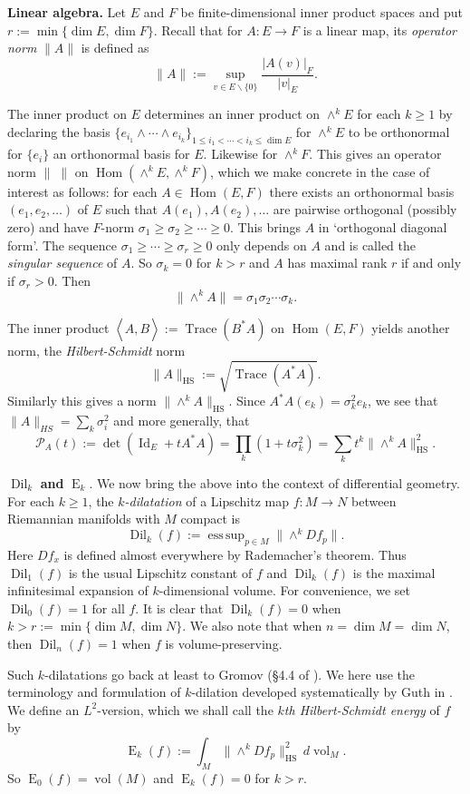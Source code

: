 \documentclass[11pt,letterpaper]{amsart}
\theoremstyle{definition}
\numberwithin{equation}{section}
\theoremstyle{definition}
\newcommand{\Pc}{\mathcal{P}}
\newcommand\ssm{\smallsetminus}
\DeclareMathOperator{\En}{E}
\DeclareMathOperator{\HS}{HS}
\DeclareMathOperator{\Id}{Id}
\DeclareMathOperator{\Hom}{Hom}
\DeclareMathOperator{\tr}{Trace}
\DeclareMathOperator{\la}{\langle}
\DeclareMathOperator{\ra}{\rangle}
\DeclareMathOperator*{\esssup}{ess\,sup}
\newcommand{\Dil}{\operatorname{Dil}}
\newcommand{\vol}{\operatorname{vol}}
\begin{document}
\medskip
\noindent
{\bf Linear algebra.} Let $E$ and $F$ be finite-dimensional inner product spaces and put $r:=\min\{\dim E,\dim F\}$.  Recall that for $A: E\to F$ is a linear map, its {\em operator norm} $\|A\|$  is defined as 
\[
\|A\|:=\sup_{v\in E\ssm \{0\}}\frac{\displaystyle |A(v)|_F}{\displaystyle |v|_E}.
\]

The  inner product on $E$ determines an inner product on $\wedge^k E$ for each $k\geq 1$ 
by declaring the basis $\{e_{i_1}\wedge \cdots \wedge e_{i_k} \}_{1\le i_1<\cdots <i_k\le \dim E}$ for $\wedge^kE$ to be orthonormal for $\{e_i\}$ an orthonormal basis for $E$. Likewise for $\wedge^k F$.  This gives an operator norm
$\|\; \|$ on $\Hom(\wedge^k E, \wedge^k F)$, which we make concrete in the case of interest as follows: for each  $A\in \Hom(E,F)$  there exists an orthonormal basis $(e_1, e_2, \dots )$ of $E$  such that $A(e_1),A(e_2), \dots$ are pairwise orthogonal (possibly zero) and have $F$-norm $\sigma_1\ge \sigma_2\ge  \cdots\ge 0$. This brings $A$ in `orthogonal diagonal form'. The sequence $\sigma_1\ge  \cdots\ge \sigma_r\ge 0$ only depends on $A$ and is called the \emph{singular sequence} of $A$.  So $\sigma_k=0$ for $k>r$ and $A$ has maximal rank $r$ if and only if $\sigma_r>0$. Then 
\[
\|\wedge^kA\|=\sigma_1\sigma_2\cdots\sigma_k.
\]

The inner product $\la A, B\ra:=\tr (B^*A)$ on $\Hom(E,F)$ 
yields another norm, the {\em Hilbert-Schmidt} norm 
\[\| A\|_{\HS}:=\sqrt{\tr (A^*A)}.\]  
Similarly this gives a norm $\|\wedge^kA\|_{\HS}$. Since  $A^*A(e_k)=\sigma_k^2 e_k$, we see that $\| A\|_{HS}=\sum_k\sigma^2_i$ and more generally, that 
\[
\textstyle \Pc_A(t):=\det (\Id_E+tA^*A)= \prod_k (1+t \sigma_k^2)=\sum_k t^k \|\wedge^kA\|^2_{\HS}.
\]

\medskip
\noindent
{\boldmath${\Dil_k}$} {\bf and} {\boldmath$\En_k$}.
We now bring the above into the context of  differential geometry. For each $k\geq 1$, the {\em $k$-dilatation} of a Lipschitz map $f:M\to N$ between Riemannian manifolds  with $M$ compact is 
\[
\Dil_k(f):=\esssup_{p\in M}\|\wedge^k Df_p\|.
 \]
Here $Df_x$ is defined almost everywhere by Rademacher's theorem. Thus
$\Dil_1(f)$ is the usual Lipschitz constant of $f$ and $\Dil_k(f)$ is the maximal
infinitesimal expansion of $k$-dimensional volume.  For convenience, we set 
$\Dil_0(f)=1$ for all $f$. It is clear  that $\Dil_k(f)=0$ when $k>r:=\min\{\dim M,\dim N\}$. We also note that 
when $n=\dim M=\dim N$, then $\Dil_n(f)=1$ when $f$ is volume-preserving.    

Such $k$-dilatations go back at least to Gromov  (\S 4.4 of \cite{Gr82}). We here use the terminology and
formulation of $k$-dilation developed systematically by Guth in \cite[\S 2]{Gu13}. We define an $L^2$-version, 
which we shall call the  \emph{$k$th Hilbert-Schmidt energy} of $f$ by  
\[
\textstyle \En_k(f):= \int_{M} \|\wedge^k Df_p\|_{\HS}^2\, d\!\vol_M.
\]
So $\En_0(f)=\vol(M)$ and $\En_k(f)=0$ for $k>r$. 
\end{document}
